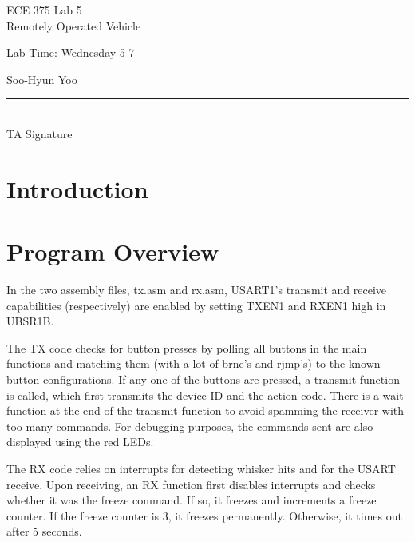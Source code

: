 \documentclass[12pt,letterpaper]{article}
\begin{document}
\begin{titlepage}
    \vspace*{4cm}
    \begin{flushright}
    {\huge
        ECE 375 Lab 5\\[1cm]
    }
    {\large
        Remotely Operated Vehicle
    }
    \end{flushright}
    \begin{flushleft}
    Lab Time: Wednesday 5-7
    \end{flushleft}
    \begin{flushright}
    Soo-Hyun Yoo

    \vfill
    \rule{5in}{.5mm}\\
    TA Signature
    \end{flushright}

\end{titlepage}

\section*{Introduction}


\section*{Program Overview}

In the two assembly files, tx.asm and rx.asm, USART1's transmit and receive capabilities (respectively) are enabled by setting TXEN1 and RXEN1 high in UBSR1B.

The TX code checks for button presses by polling all buttons in the main functions and matching them (with a lot of brne's and rjmp's) to the known button configurations. If any one of the buttons are pressed, a transmit function is called, which first transmits the device ID and the action code. There is a wait function at the end of the transmit function to avoid spamming the receiver with too many commands. For debugging purposes, the commands sent are also displayed using the red LEDs.

The RX code relies on interrupts for detecting whisker hits and for the USART receive. Upon receiving, an RX function first disables interrupts and checks whether it was the freeze command. If so, it freezes and increments a freeze counter. If the freeze counter is 3, it freezes permanently. Otherwise, it times out after 5 seconds.
\end{document}
